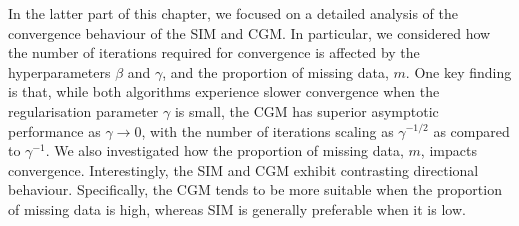 In the latter part of this chapter, we focused on a detailed analysis of the convergence behaviour of the SIM and CGM. In particular, we considered how the number of iterations required for convergence is affected by the hyperparameters $\beta$ and $\gamma$, and the proportion of missing data, $m$. One key finding is that, while both algorithms experience slower convergence when the regularisation parameter $\gamma$ is small, the CGM has superior asymptotic performance as $\gamma \rightarrow 0$, with the number of iterations scaling as $\gamma^{-1/2}$ as compared to $\gamma^{-1}$. We also investigated how the proportion of missing data, $m$, impacts convergence. Interestingly, the SIM and CGM exhibit contrasting directional behaviour. Specifically, the CGM tends to be more suitable when the proportion of missing data is high, whereas SIM is generally preferable when it is low.



